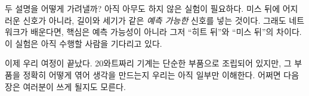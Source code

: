 두 설명을 어떻게 가려낼까? 아직 아무도 하지 않은 실험이 필요하다. 미스 뒤에 어지러운 신호가 아니라, 길이와 세기가 같은 \emph{예측 가능한} 신호를 넣는 것이다. 그래도 네트워크가 배운다면, 핵심은 예측 가능성이 아니라 그저 “히트 뒤”와 “미스 뒤”의 차이다. 이 실험은 아직 수행할 사람을 기다리고 있다.

이제 우리 여정이 끝났다. 20와트짜리 기계는 단순한 부품으로 조립되어 있지만, 그 부품을 정확히 어떻게 엮어 생각을 만드는지 우리는 아직 일부만 이해한다. 어쩌면 다음 장은 여러분이 쓰게 될지도 모른다.

